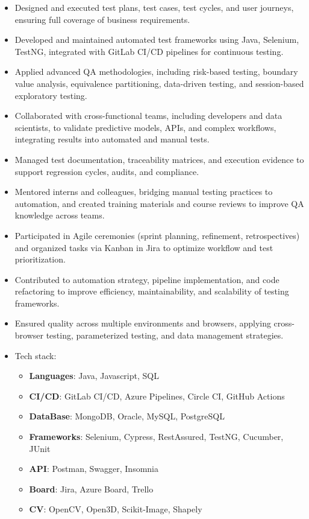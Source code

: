 

{\small
{}
\begin{itemize}
    \item Designed and executed test plans, test cases, test cycles, and user journeys, ensuring full coverage of business requirements.
    \item Developed and maintained automated test frameworks using Java, Selenium, TestNG, integrated with GitLab CI/CD pipelines for continuous testing.
    \item Applied advanced QA methodologies, including risk-based testing, boundary value analysis, equivalence partitioning, data-driven testing, and session-based exploratory testing.
    \item Collaborated with cross-functional teams, including developers and data scientists, to validate predictive models, APIs, and complex workflows, integrating results into automated and manual tests.
    \item Managed test documentation, traceability matrices, and execution evidence to support regression cycles, audits, and compliance.
    \item Mentored interns and colleagues, bridging manual testing practices to automation, and created training materials and course reviews to improve QA knowledge across teams.
    \item Participated in Agile ceremonies (sprint planning, refinement, retrospectives) and organized tasks via Kanban in Jira to optimize workflow and test prioritization.
    \item Contributed to automation strategy, pipeline implementation, and code refactoring to improve efficiency, maintainability, and scalability of testing frameworks.
    \item Ensured quality across multiple environments and browsers, applying cross-browser testing, parameterized testing, and data management strategies.
    \item Tech stack:
    \begin{itemize}
        \item \textbf{Languages}: {\color{accent2}Java, Javascript, SQL}
        \item \textbf{CI/CD}: {\color{accent2}GitLab CI/CD, Azure Pipelines, Circle CI, GitHub Actions}
        \item \textbf{DataBase}: {\color{accent2}MongoDB, Oracle, MySQL, PostgreSQL}
        \item \textbf{Frameworks}: {\color{accent2}Selenium, Cypress, RestAssured, TestNG, Cucumber, JUnit}
        \item \textbf{API}: {\color{accent2}Postman, Swagger, Insomnia}
        \item \textbf{Board}: {\color{accent2}Jira, Azure Board, Trello}
        \item \textbf{CV}: {\color{accent2}OpenCV, Open3D, Scikit-Image, Shapely}
    \end{itemize}
\end{itemize}

}
